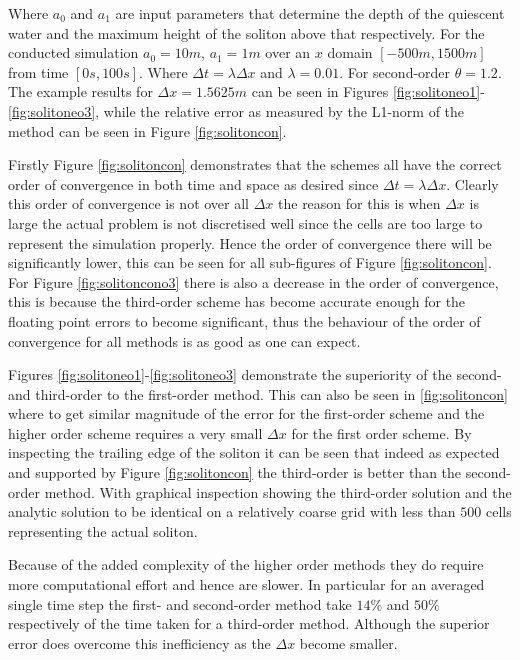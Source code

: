 \documentclass[SingleSpace,12pt]{Serre_ASCE}
\begin{document}
Where $a_0$ and $a_1$ are input parameters that determine the depth of the quiescent water and the maximum height of the soliton above that respectively. For the conducted simulation $a_0 = 10m$, $a_1 = 1m$ over an $x$ domain $\left[-500m,1500m\right]$ from time $\left[0s,100s\right]$. Where $\Delta t = \lambda \Delta x$ and $\lambda = 0.01$. For second-order $\theta = 1.2$. The example results for $\Delta x = 1.5625m$ can be seen in Figures \ref{fig:solitoneo1}-\ref{fig:solitoneo3}, while the relative error as measured by the L1-norm of the method can be seen in Figure \ref{fig:solitoncon}.

Firstly Figure \ref{fig:solitoncon} demonstrates that the schemes all have the correct order of convergence in both time and space as desired since $\Delta t = \lambda \Delta x$. Clearly this order of convergence is not over all $\Delta x$ the reason for this is when $\Delta x$ is large the actual problem is not discretised well since the cells are too large to represent the simulation properly. Hence the order of convergence there will be significantly lower, this can be seen for all sub-figures of Figure \ref{fig:solitoncon}. For Figure \ref{fig:solitoncono3} there is also a decrease in the order of convergence, this is because the third-order scheme has become accurate enough for the floating point errors to become significant, thus the behaviour of the order of convergence for all methods is as good as one can expect. 

Figures \ref{fig:solitoneo1}-\ref{fig:solitoneo3} demonstrate the superiority of the second- and third-order to the first-order method. This can also be seen in \ref{fig:solitoncon} where to get similar magnitude of the error for the first-order scheme and the higher order scheme requires a very small $\Delta x$ for the first order scheme. By inspecting the trailing edge of the soliton it can be seen that indeed as expected and supported by Figure \ref{fig:solitoncon} the third-order is better than the second-order method. With graphical inspection showing the third-order solution and the analytic solution to be identical on a relatively coarse grid with less than $500$ cells representing the actual soliton. 

Because of the added complexity of the higher order methods they do require more computational effort and hence are slower. In particular for an averaged single time step the first- and second-order method take $14\%$ and $50\%$ respectively of the time taken for a third-order method. Although the superior error does overcome this inefficiency as the $\Delta x$ become smaller. 
\end{document}
